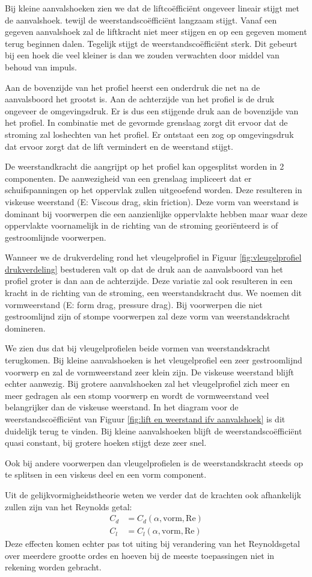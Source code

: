 Bij kleine aanvalshoeken zien we dat de liftcoëfficiënt ongeveer lineair stijgt met de aanvalshoek. tewijl de weerstandscoëfficiënt langzaam stijgt. Vanaf een gegeven aanvalshoek zal de liftkracht niet meer stijgen en op een gegeven moment terug beginnen dalen. Tegelijk stijgt de weerstandscoëfficiënt sterk. Dit gebeurt bij een hoek die veel kleiner is dan we zouden verwachten door middel van behoud van impuls.

Aan de bovenzijde van het profiel heerst een onderdruk die net na de aanvalsboord het grootst is. Aan de achterzijde van het profiel is de druk ongeveer de omgevingsdruk. Er is dus een stijgende druk aan de bovenzijde van het profiel. In combinatie met de gevormde grenslaag zorgt dit ervoor dat de stroming zal loshechten van het profiel. Er ontstaat een zog op omgevingsdruk dat ervoor zorgt dat de lift vermindert en de weerstand stijgt.

De weerstandkracht die aangrijpt op het profiel kan opgesplitst worden in 2 componenten. De aanwezigheid van een grenslaag impliceert dat er schuifspanningen op het oppervlak zullen uitgeoefend worden. Deze resulteren in viskeuse weerstand (E: Viscous drag, skin friction). Deze vorm van weerstand is dominant bij voorwerpen die een aanzienlijke oppervlakte hebben maar waar deze oppervlakte voornamelijk in de richting van de stroming georiënteerd is of gestroomlijnde voorwerpen.

Wanneer we de drukverdeling rond het vleugelprofiel in Figuur \ref{fig:vleugelprofiel drukverdeling} bestuderen valt op dat de druk aan de aanvalsboord van het profiel groter is dan aan de achterzijde. Deze variatie zal ook resulteren in een kracht in de richting van de stroming, een weerstandskracht dus. We noemen dit vormweerstand (E: form drag, pressure drag). Bij voorwerpen die niet gestroomlijnd zijn of stompe voorwerpen zal deze vorm van weerstandskracht domineren.

We zien dus dat bij vleugelprofielen beide vormen van weerstandskracht terugkomen. Bij kleine aanvalshoeken is het vleugelprofiel een zeer gestroomlijnd voorwerp en zal de vormweerstand zeer klein zijn. De viskeuse weerstand blijft echter aanwezig. Bij grotere aanvalshoeken zal het vleugelprofiel zich meer en meer gedragen als een stomp voorwerp en wordt de vormweerstand veel belangrijker dan de viskeuse weerstand. In het diagram voor de weerstandscoëfficiënt van Figuur \ref{fig:lift en weerstand ifv aanvalshoek} is dit duidelijk terug te vinden. Bij kleine aanvalshoeken blijft de weerstandscoëfficiënt quasi constant, bij grotere hoeken stijgt deze zeer snel.

Ook bij andere voorwerpen dan vleugelprofielen is de weerstandskracht steeds op te splitsen in een viskeus deel en een vorm component.

Uit de gelijkvormigheidstheorie weten we verder dat de krachten ook afhankelijk zullen zijn van het Reynolds getal: 
\begin{align}
	C_d &= C_d(\alpha,\mathrm{vorm},\mathrm{Re}) \\
	C_l &= C_l(\alpha,\mathrm{vorm},\mathrm{Re})
\end{align}
Deze effecten komen echter pas tot uiting bij verandering van het Reynoldsgetal over meerdere grootte ordes en hoeven bij de meeste toepassingen niet in rekening worden gebracht.
